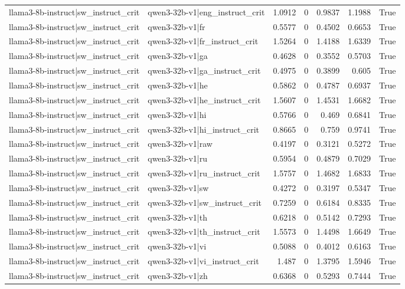 \begin{table}
\begin{tabular}{l l r r r r l}
llama3-8b-instruct|sw_instruct_crit & qwen3-32b-v1|eng_instruct_crit & 1.0912 & 0 & 0.9837 & 1.1988 & True \\
llama3-8b-instruct|sw_instruct_crit & qwen3-32b-v1|fr & 0.5577 & 0 & 0.4502 & 0.6653 & True \\
llama3-8b-instruct|sw_instruct_crit & qwen3-32b-v1|fr_instruct_crit & 1.5264 & 0 & 1.4188 & 1.6339 & True \\
llama3-8b-instruct|sw_instruct_crit & qwen3-32b-v1|ga & 0.4628 & 0 & 0.3552 & 0.5703 & True \\
llama3-8b-instruct|sw_instruct_crit & qwen3-32b-v1|ga_instruct_crit & 0.4975 & 0 & 0.3899 & 0.605 & True \\
llama3-8b-instruct|sw_instruct_crit & qwen3-32b-v1|he & 0.5862 & 0 & 0.4787 & 0.6937 & True \\
llama3-8b-instruct|sw_instruct_crit & qwen3-32b-v1|he_instruct_crit & 1.5607 & 0 & 1.4531 & 1.6682 & True \\
llama3-8b-instruct|sw_instruct_crit & qwen3-32b-v1|hi & 0.5766 & 0 & 0.469 & 0.6841 & True \\
llama3-8b-instruct|sw_instruct_crit & qwen3-32b-v1|hi_instruct_crit & 0.8665 & 0 & 0.759 & 0.9741 & True \\
llama3-8b-instruct|sw_instruct_crit & qwen3-32b-v1|raw & 0.4197 & 0 & 0.3121 & 0.5272 & True \\
llama3-8b-instruct|sw_instruct_crit & qwen3-32b-v1|ru & 0.5954 & 0 & 0.4879 & 0.7029 & True \\
llama3-8b-instruct|sw_instruct_crit & qwen3-32b-v1|ru_instruct_crit & 1.5757 & 0 & 1.4682 & 1.6833 & True \\
llama3-8b-instruct|sw_instruct_crit & qwen3-32b-v1|sw & 0.4272 & 0 & 0.3197 & 0.5347 & True \\
llama3-8b-instruct|sw_instruct_crit & qwen3-32b-v1|sw_instruct_crit & 0.7259 & 0 & 0.6184 & 0.8335 & True \\
llama3-8b-instruct|sw_instruct_crit & qwen3-32b-v1|th & 0.6218 & 0 & 0.5142 & 0.7293 & True \\
llama3-8b-instruct|sw_instruct_crit & qwen3-32b-v1|th_instruct_crit & 1.5573 & 0 & 1.4498 & 1.6649 & True \\
llama3-8b-instruct|sw_instruct_crit & qwen3-32b-v1|vi & 0.5088 & 0 & 0.4012 & 0.6163 & True \\
llama3-8b-instruct|sw_instruct_crit & qwen3-32b-v1|vi_instruct_crit & 1.487 & 0 & 1.3795 & 1.5946 & True \\
llama3-8b-instruct|sw_instruct_crit & qwen3-32b-v1|zh & 0.6368 & 0 & 0.5293 & 0.7444 & True \\

\end{tabular}
\end{table}
